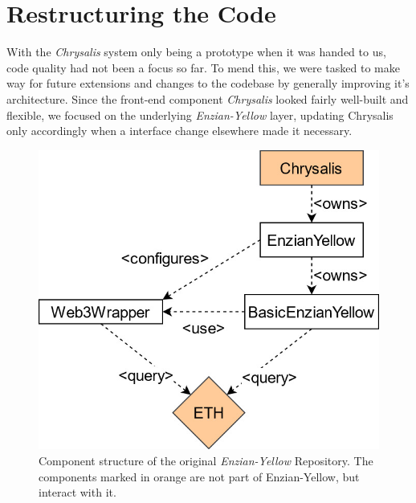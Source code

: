 %
\section{Restructuring the Code}
\label{sec:impr:enzian}

With the \emph{Chrysalis} system only being a prototype when it was handed to us, code quality had not been a focus so far. To mend this, we were tasked to make way for future extensions and changes to the codebase by generally improving it's architecture. \newline
Since the front-end component \emph{Chrysalis} looked fairly well-built and flexible, we focused on the underlying \emph{Enzian-Yellow} layer, updating Chrysalis only accordingly when a interface change elsewhere made it necessary.

\begin{figure}[h]
	\centering
	\captionsetup{justification=centering,margin=2cm}
	\includegraphics[height=0.5\textwidth]{gfx/enzian-original}
	\caption{Component structure of the original \emph{Enzian-Yellow} Repository. The components marked in orange are not part of Enzian-Yellow, but interact with it.}
	\label{fig:impr:enzian:original}
\end{figure}

